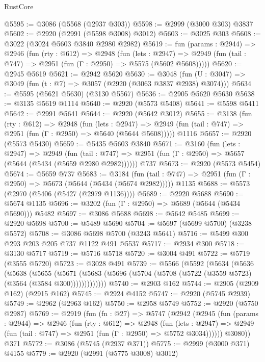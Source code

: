 \begin{lexlean}{RustCore}
\begin{coremodule}
@5595 := @3086 (@5568 (@2937 @303))
@5598 := @2999 (@3000 @303) @3837
@5602 := @2920 (@2991 (@5598 @3008) @3012)
@5603 := @3025 @303
@5608 := @3022 (@3024 @5603 @3840 @2980 @2982)
@5619 := fun (params : @2944) =>
  @2946
    (fun (rty : @612) =>
    @2948
      (fun (lets : @2947) =>
      @2949 (fun (tail : @747) => @2951 (fun (Γ : @2950) => @5575 (@5602 @5608)))))
@5620 := @2945 @5619
@5621 := @2942 @5620
@5630 := @3048 (fun (U : @3047) => @3049 (fun (t : @7) => @3057 (@2920 (@3063 @3837 @2938) @3074)))
@5634 := @5595 (@5621 @5630) (@3130 @5567)
@5636 := @2905 @5620 @5630
@5638 := @3135 @5619 @1114
@5640 := @2920 (@5573 @5408)
@5641 := @5598 @5411
@5642 := @2991 @5641
@5644 := @2920 (@5642 @3012)
@5655 := @3138
    (fun (rty : @612) =>
    @2948
      (fun (lets : @2947) =>
      @2949 (fun (tail : @747) => @2951 (fun (Γ : @2950) => @5640 (@5644 @5608)))))
    @1116
@5657 := @2920 (@5573 @5430)
@5659 := @5435 @5603 @3840
@5671 := @3160
    (fun (lets : @2947) =>
    @2949
      (fun (tail : @747) => @2951 (fun (Γ : @2950) => @5657 (@5644 (@5434 (@5659 @2980 @2982))))))
    @737
@5673 := @2920 (@5573 @5454)
@5674 := @5659 @737
@5683 := @3184
    (fun (tail : @747) => @2951 (fun (Γ : @2950) => @5673 (@5644 (@5434 (@5674 @2982)))))
    @1135
@5688 := @5573 (@2970 (@5406 (@5427 (@2979 @1136))))
@5689 := @2920 @5688
@5690 := @5674 @1135
@5696 := @3202 (fun (Γ : @2950) => @5689 (@5644 (@5434 @5690))) @5482
@5697 := @3086 @5688
@5698 := @5642 @5485
@5699 := @2920 @5698
@5700 := @5489 @5690
@5704 := @5697 (@5699 @5700) (@3238 @5572)
@5708 := @3086 @5698 @5700 (@3243 @5641)
@5716 := @5499 @300 @293 @203 @205 @737 @1122 @491 @5537
@5717 := @2934 @300
@5718 := @3130 @5717
@5719 := @5716 @5718
@5720 := @3004 @491
@5722 := @5719 (@3555 @5720)
@5723 := @3028 @491
@5739 := @5566
    (@5592
      (@5634
        (@5636
          (@5638
            (@5655
              (@5671
                (@5683 (@5696 (@5704 (@5708 (@5722 (@3559 @5723) (@3564 (@3584 @300)))))))))))))
@5740 := @2903 @162
@5744 := @2905 (@2909 @162) (@2915 @162)
@5745 := @2924 @4152
@5747 := @2920 (@5745 @2939)
@5749 := @2962 (@2963 @162)
@5750 := @2958 @5749
@5752 := @2920 (@5750 @2987)
@5769 := @2919
    (fun (fn : @27) =>
    @5747
      (@2942
        (@2945
          (fun (params : @2944) =>
          @2946
            (fun (rty : @612) =>
            @2948
              (fun (lets : @2947) =>
              @2949 (fun (tail : @747) => @2951 (fun (Γ : @2950) => @5752 @3034))))))
        @3080))
    @371
@5772 := @3086 (@5745 (@2937 @371))
@5775 := @2999 (@3000 @371) @4155
@5779 := @2920 (@2991 (@5775 @3008) @3012)

\end{coremodule}
\end{lexlean}
